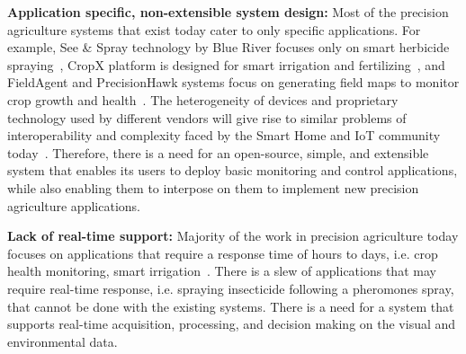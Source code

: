 \noindent
\textbf{Application specific, non-extensible system design:}
Most of the precision agriculture systems that exist today cater to only specific applications. For example, See \& Spray technology by Blue River focuses only on smart herbicide spraying~\cite{see&spray}, CropX platform is designed for smart irrigation and fertilizing~\cite{cropx}, and FieldAgent and PrecisionHawk systems focus on generating field maps to monitor crop growth and health~\cite{precisionhawk, fieldagent-sentera}. The heterogeneity of devices and proprietary technology used by different vendors will give rise to similar problems of interoperability and complexity faced by the Smart Home and IoT community today~\cite{home-os-challenges}. Therefore, there is a need for an open-source, simple, and extensible system that enables its users to deploy basic monitoring and control applications, while also enabling them to interpose on them to implement new precision agriculture applications.



\noindent
\textbf{Lack of real-time support:}
Majority of the work in precision agriculture today focuses on applications that require a response time of hours to days, i.e. crop health monitoring, smart irrigation~\cite{precisionhawk, fieldagent-sentera}. 
There is a slew of applications that may require real-time response, i.e. spraying insecticide following a pheromones spray, that cannot be done with the existing systems. There is a need for a system that supports real-time acquisition, processing, and decision making on the visual and environmental data. 


